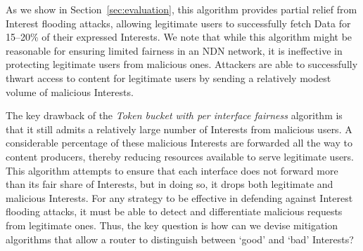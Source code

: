 \documentclass[10pt,conference]{IEEEtran}
\begin{document}
As we show in Section~\ref{sec:evaluation}, this algorithm provides partial relief from Interest flooding attacks, allowing legitimate users to successfully fetch Data for 15--20\% of their expressed Interests. 
We note that while this algorithm might be reasonable for ensuring limited fairness in an NDN network, it is ineffective in protecting legitimate users from malicious ones. 
Attackers are able to successfully thwart access to content for legitimate users by sending a relatively modest volume of malicious Interests.





The key drawback of the {\it Token bucket with per interface fairness} algorithm is that it still admits a relatively large number of Interests from malicious users. A considerable percentage of these malicious Interests are forwarded all the way to content producers, thereby reducing resources available to serve legitimate users.  This algorithm attempts to ensure that each interface does not forward more than its fair share of Interests, but in doing so, it drops both legitimate and malicious Interests. For any strategy to be effective in defending against Interest flooding attacks, it must be able to detect and differentiate malicious requests from legitimate ones. 
Thus, the key question is how can we devise mitigation algorithms that allow a router to distinguish between `good' and `bad' Interests? 


  
\end{document}
